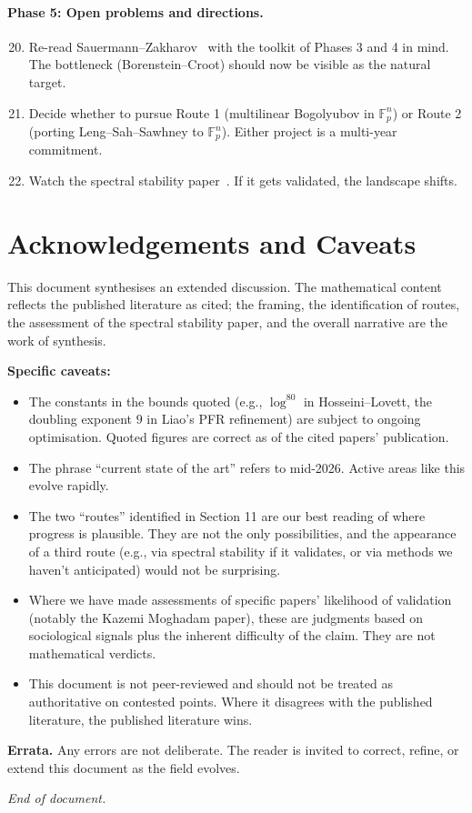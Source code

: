 \documentclass[11pt,a4paper]{article}
\theoremstyle{plain}
\theoremstyle{definition}
\theoremstyle{remark}
\newcommand{\F}{\mathbb{F}}
\begin{document}
\paragraph{Phase 5: Open problems and directions.}
\begin{enumerate}[leftmargin=2em]
\setcounter{enumi}{19}
  \item Re-read Sauermann--Zakharov~\cite{sauermannzakharov2023} with the toolkit of Phases 3 and 4 in mind. The bottleneck (Borenstein--Croot) should now be visible as the natural target.
  \item Decide whether to pursue Route 1 (multilinear Bogolyubov in $\F_p^n$) or Route 2 (porting Leng--Sah--Sawhney to $\F_p^n$). Either project is a multi-year commitment.
  \item Watch the spectral stability paper~\cite{kazemi2025}. If it gets validated, the landscape shifts.
\end{enumerate}

\section{Acknowledgements and Caveats}

This document synthesises an extended discussion. The mathematical content reflects the published literature as cited; the framing, the identification of routes, the assessment of the spectral stability paper, and the overall narrative are the work of synthesis.

\textbf{Specific caveats:}

\begin{itemize}[leftmargin=2em]
  \item The constants in the bounds quoted (e.g., $\log^{80}$ in Hosseini--Lovett, the doubling exponent $9$ in Liao's PFR refinement) are subject to ongoing optimisation. Quoted figures are correct as of the cited papers' publication.
  \item The phrase ``current state of the art'' refers to mid-2026. Active areas like this evolve rapidly.
  \item The two ``routes'' identified in Section 11 are our best reading of where progress is plausible. They are not the only possibilities, and the appearance of a third route (e.g., via spectral stability if it validates, or via methods we haven't anticipated) would not be surprising.
  \item Where we have made assessments of specific papers' likelihood of validation (notably the Kazemi Moghadam paper), these are judgments based on sociological signals plus the inherent difficulty of the claim. They are not mathematical verdicts.
  \item This document is not peer-reviewed and should not be treated as authoritative on contested points. Where it disagrees with the published literature, the published literature wins.
\end{itemize}

\textbf{Errata.} Any errors are not deliberate. The reader is invited to correct, refine, or extend this document as the field evolves.

\vspace{2em}
\begin{center}
\textit{End of document.}
\end{center}
\end{document}
